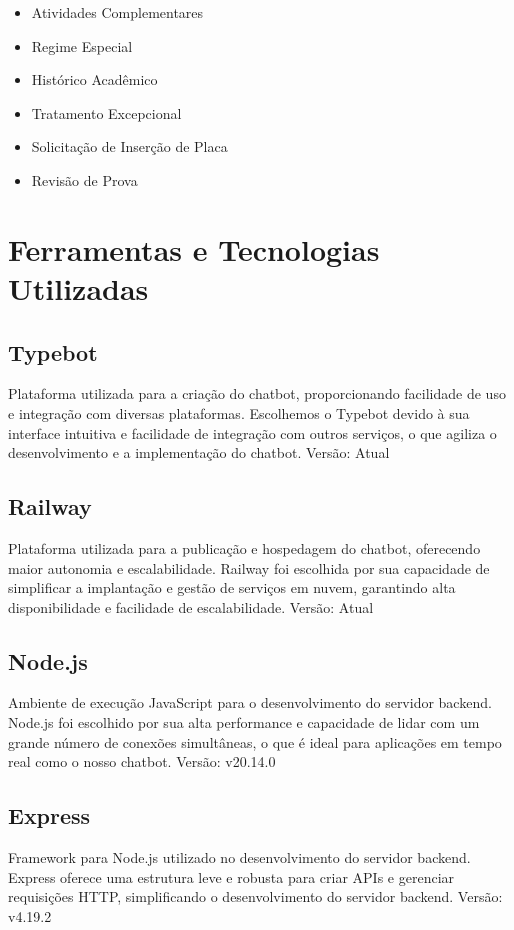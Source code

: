 \documentclass[12pt,a4paper]{article} %
\begin{document}
\begin{itemize}
    \item Atividades Complementares
    \item Regime Especial
    \item Histórico Acadêmico
    \item Tratamento Excepcional
    \item Solicitação de Inserção de Placa
    \item Revisão de Prova
\end{itemize}

\section{Ferramentas e Tecnologias Utilizadas}

\subsection{Typebot}
Plataforma utilizada para a criação do chatbot, proporcionando facilidade de uso e integração com diversas plataformas. Escolhemos o Typebot devido à sua interface intuitiva e facilidade de integração com outros serviços, o que agiliza o desenvolvimento e a implementação do chatbot. Versão: Atual

\subsection{Railway}
Plataforma utilizada para a publicação e hospedagem do chatbot, oferecendo maior autonomia e escalabilidade. Railway foi escolhida por sua capacidade de simplificar a implantação e gestão de serviços em nuvem, garantindo alta disponibilidade e facilidade de escalabilidade. Versão: Atual

\subsection{Node.js}
Ambiente de execução JavaScript para o desenvolvimento do servidor backend. Node.js foi escolhido por sua alta performance e capacidade de lidar com um grande número de conexões simultâneas, o que é ideal para aplicações em tempo real como o nosso chatbot. Versão: v20.14.0

\subsection{Express}
Framework para Node.js utilizado no desenvolvimento do servidor backend. Express oferece uma estrutura leve e robusta para criar APIs e gerenciar requisições HTTP, simplificando o desenvolvimento do servidor backend. Versão: v4.19.2
\end{document}

